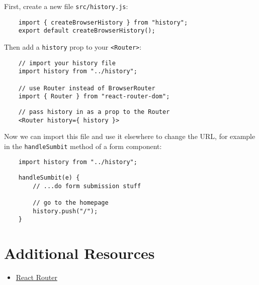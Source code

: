 First, create a new file \texttt{src/history.js}:

\begin{verbatim}
    import { createBrowserHistory } from "history";
    export default createBrowserHistory();
\end{verbatim}

Then add a \texttt{history} prop to your \texttt{<Router>}:

\begin{verbatim}
    // import your history file
    import history from "../history";

    // use Router instead of BrowserRouter
    import { Router } from "react-router-dom";
\end{verbatim}

\begin{verbatim}
    // pass history in as a prop to the Router
    <Router history={ history }>
\end{verbatim}

Now we can import this file and use it elsewhere to change the URL, for example in the \texttt{handleSumbit} method of a form component:

\begin{verbatim}
    import history from "../history";
\end{verbatim}

\begin{verbatim}
    handleSumbit(e) {
        // ...do form submission stuff

        // go to the homepage
        history.push("/");
    }
\end{verbatim}




\section{Additional Resources}

\begin{itemize}[leftmargin=*]
    \item \href{https://reacttraining.com/react-router/web/guides/philosophy}{React Router}
\end{itemize}
